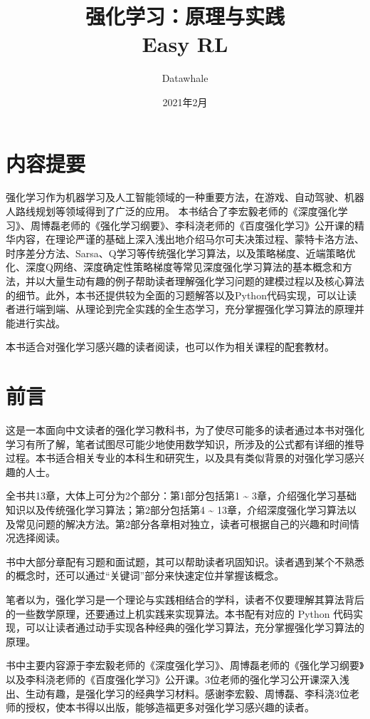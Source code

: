 \documentclass[UTF8]{ctexart}
\title{强化学习：原理与实践 \\[0.4cm] Easy RL}
\author{Datawhale}
\date{2021年2月}
\numberwithin{equation}{section}
\numberwithin{figure}{section}
\numberwithin{table}{section}
\begin{document}
    
    \thispagestyle{empty}
    \clearpage
    
    \section*{内容提要}
    强化学习作为机器学习及人工智能领域的一种重要方法，在游戏、自动驾驶、机器人路线规划等领域得到了广泛的应用。
    本书结合了李宏毅老师的《深度强化学习》、周博磊老师的《强化学习纲要》、李科浇老师的《百度强化学习》公开课的精华内容，在理论严谨的基础上深入浅出地介绍马尔可夫决策过程、蒙特卡洛方法、时序差分方法、Sarsa、Q学习等传统强化学习算法，以及策略梯度、近端策略优化、深度Q网络、深度确定性策略梯度等常见深度强化学习算法的基本概念和方法，并以大量生动有趣的例子帮助读者理解强化学习问题的建模过程以及核心算法的细节。此外，本书还提供较为全面的习题解答以及Python代码实现，可以让读者进行端到端、从理论到完全实践的全生态学习，充分掌握强化学习算法的原理并能进行实战。

    本书适合对强化学习感兴趣的读者阅读，也可以作为相关课程的配套教材。


    \clearpage
    \section*{前言}
    \renewcommand{\abstractname}{}


    这是一本面向中文读者的强化学习教科书，为了使尽可能多的读者通过本书对强化学习有所了解，笔者试图尽可能少地使用数学知识，所涉及的公式都有详细的推导过程。本书适合相关专业的本科生和研究生，以及具有类似背景的对强化学习感兴趣的人士。

    全书共13章，大体上可分为2个部分：第1部分包括第1 \~{} 3章，介绍强化学习基础知识以及传统强化学习算法；第2部分包括第4 \~{} 13章，介绍深度强化学习算法以及常见问题的解决方法。第2部分各章相对独立，读者可根据自己的兴趣和时间情况选择阅读。
        
    书中大部分章配有习题和面试题，其可以帮助读者巩固知识。读者遇到某个不熟悉的概念时，还可以通过“关键词”部分来快速定位并掌握该概念。
        
    笔者以为，强化学习是一个理论与实践相结合的学科，读者不仅要理解其算法背后的一些数学原理，还要通过上机实践来实现算法。本书配有对应的 Python 代码实现，可以让读者通过动手实现各种经典的强化学习算法，充分掌握强化学习算法的原理。
        
    书中主要内容源于李宏毅老师的《深度强化学习》、周博磊老师的《强化学习纲要》以及李科浇老师的《百度强化学习》公开课。3位老师的强化学习公开课深入浅出、生动有趣，是强化学习的经典学习材料。感谢李宏毅、周博磊、李科浇3位老师的授权，使本书得以出版，能够造福更多对强化学习感兴趣的读者。
        
\end{document}
